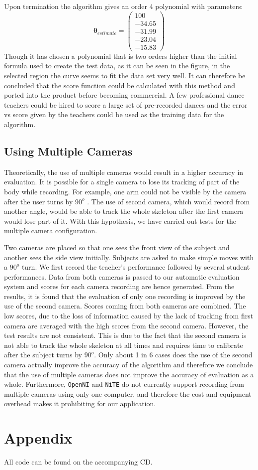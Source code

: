 \documentclass[11pt,a4paper]{article}
\begin{document}
\noindent 
Upon termination the algorithm gives an order 4 polynomial with parameters:
\begin{equation}
\boldsymbol \theta_{estimate} = 
\begin{pmatrix}
100\\
-34.65\\
-31.99\\
-23.04\\
-15.83
\end{pmatrix}
\end{equation}
\noindent 
Though it has chosen a polynomial that is two orders higher than the initial formula used to create the test data, as it can be seen in the figure, in the selected region the curve seems to fit the data set very well. It can therefore be concluded that the score function could be calculated with this method and ported into the product before becoming commercial. A few professional dance teachers could be hired to score a large set of pre-recorded dances and the error vs score given by the teachers could be used as the training data for the algorithm. 


\subsection{Using Multiple Cameras}
Theoretically, the use of multiple cameras would result in a higher accuracy in evaluation. It is possible for a single camera to lose its tracking of part of the body while recording. For example, one arm could not be visible by the camera after the user turns by $90^o$ . The use of second camera, which would record from another angle, would be able to track the whole skeleton after the first camera would lose part of it. With this hypothesis, we have carried out tests for the multiple camera configuration.

\noindent
Two cameras are placed so that one sees the front view of the subject and another sees the side view initially. Subjects are asked to make simple moves with a $90^o$ turn. We first record the teacher's performance followed by several student performances. Data from both cameras is passed to our automatic evaluation system and scores for each camera recording are hence generated. From the results, it is found that the evaluation of only one recording is improved by the use of the second camera. Scores coming from both cameras are combined. The low scores, due to the loss of information caused by the lack of tracking from first camera are averaged with the high scores from the second camera. However, the test results are not consistent. This is due to the fact that the second camera is not able to track the whole skeleton at all times and requires time to calibrate after the subject turns by $90^o$. Only about 1 in 6 cases does the use of the second camera actually improve the accuracy of the algorithm and therefore we conclude that the use of multiple cameras does not improve the accuracy of evaluation as a whole. Furthermore, \texttt{OpenNI} and \texttt{NiTE} do not currently support recording from multiple cameras using only one computer, and therefore the cost and equipment overhead makes it prohibiting for our application. 

\clearpage
\section*{Appendix}
All code can be found on the accompanying CD. 
\end{document}

